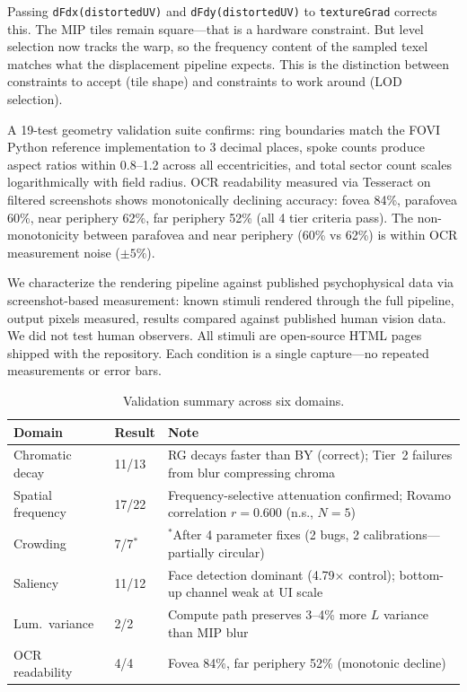 \documentclass[10pt,twocolumn,letterpaper]{article}
\makeatletter
\renewcommand\section{\@startsection{section}{1}{\z@}{5pt}{2pt}{\normalfont\bfseries\normalsize}}
\makeatother
\begin{document}
Passing \texttt{dFdx(distortedUV)} and \texttt{dFdy(distortedUV)} to \texttt{textureGrad} corrects this. The MIP tiles remain square---that is a hardware constraint. But level selection now tracks the warp, so the frequency content of the sampled texel matches what the displacement pipeline expects. This is the distinction between constraints to accept (tile shape) and constraints to work around (LOD selection).

A 19-test geometry validation suite confirms: ring boundaries match the FOVI Python reference implementation to 3 decimal places, spoke counts produce aspect ratios within 0.8--1.2 across all eccentricities, and total sector count scales logarithmically with field radius. OCR readability measured via Tesseract on filtered screenshots shows monotonically declining accuracy: fovea 84\%, parafovea 60\%, near periphery 62\%, far periphery 52\% (all 4 tier criteria pass). The non-monotonicity between parafovea and near periphery (60\% vs 62\%) is within OCR measurement noise (${\pm}5\%$).

\section{Validation}\label{sec:validation}

We characterize the rendering pipeline against published psychophysical data via screenshot-based measurement: known stimuli rendered through the full pipeline, output pixels measured, results compared against published human vision data. We did not test human observers. All stimuli are open-source HTML pages shipped with the repository. Each condition is a single capture---no repeated measurements or error bars.

\begin{table}[H]
\centering
\caption{Validation summary across six domains.}\vspace{-2pt}
\label{tab:validation_summary}
\scriptsize
\begin{tabular}{@{}llp{4.5cm}@{}}
\toprule
\textbf{Domain} & \textbf{Result} & \textbf{Note} \\
\midrule
Chromatic decay & 11/13 & RG decays faster than BY (correct); Tier~2 failures from blur compressing chroma \\
Spatial frequency & 17/22 & Frequency-selective attenuation confirmed; Rovamo correlation $r{=}0.600$ (n.s., $N{=}5$) \\
Crowding & 7/7$^*$ & $^*$After 4 parameter fixes (2 bugs, 2 calibrations---partially circular) \\
Saliency & 11/12 & Face detection dominant (4.79$\times$ control); bottom-up channel weak at UI scale \\
Lum.\ variance & 2/2 & Compute path preserves 3--4\% more $L$ variance than MIP blur \\
OCR readability & 4/4 & Fovea 84\%, far periphery 52\% (monotonic decline) \\
\bottomrule
\end{tabular}
\end{table}
\end{document}
